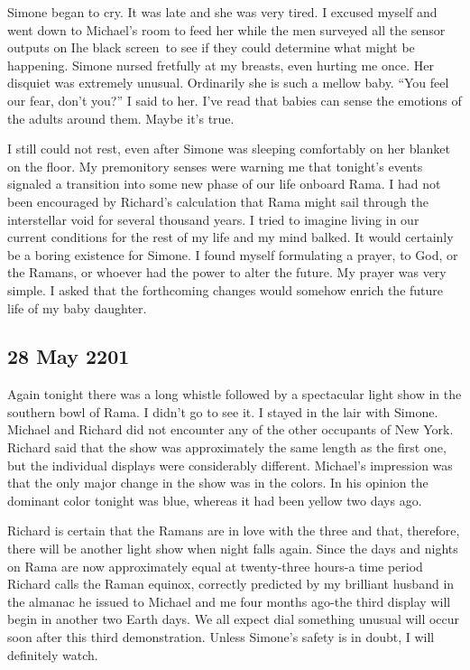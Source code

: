 \documentclass[]{article}
\begin{document}
Simone began to cry.  It was late and she was very tired.  I excused myself and went down to Michael’s room to feed her while the men surveyed all the sensor outputs on Ihe black screen~to see if they could determine what might be happening.  Simone nursed fretfully at my breasts, even hurting me once.  Her disquiet was extremely unusual.  Ordinarily she is such a mellow baby.  “You feel our fear, don’t you?” I said to her.  I’ve read that babies can sense the emotions of the adults around them.  Maybe it’s true.

I still could not rest, even after Simone was sleeping comfortably on her blanket on the floor.  My premonitory senses were warning me that tonight’s events signaled a transition into some new phase of our life onboard Rama.  I had not been encouraged by Richard’s calculation that Rama might sail through the interstellar void for several thousand years.  I tried to imagine living in our current conditions for the rest of my life and my mind balked.  It would certainly be a boring existence for Simone.  I found myself formulating a prayer, to God, or the Ramans, or whoever had the power to alter the future.  My prayer was very simple.  I asked that the forthcoming changes would somehow enrich the future life of my baby daughter.

\subsection*{28 May 2201}

Again tonight there was a long whistle followed by a spectacular light show in the southern bowl of Rama.  I didn’t go to see it.  I stayed in the lair with Simone.  Michael and Richard did not encounter any of the other occupants of New York.  Richard said that the show was approximately the same length as the first one, but the individual displays were considerably different.  Michael’s impression was that the only major change in the show was in the colors.  In his opinion the dominant color tonight was blue, whereas it had been yellow two days ago.

Richard is certain that the Ramans are in love with the three and that, therefore, there will be another light show when night falls again.  Since the days and nights on Rama are now approximately equal at twenty-three hours-a time period Richard calls the Raman equinox, correctly predicted by my brilliant husband in the almanac he issued to Michael and me four months ago-the third display will begin in another two Earth days.  We all expect dial something unusual will occur soon after this third demonstration.  Unless Simone’s safety is in doubt, I will definitely watch.
\end{document}
